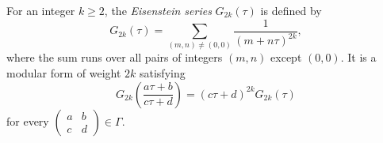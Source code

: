For an integer $k \geq 2$, the \textit{Eisenstein series} $G_{2k}(\tau)$ is defined by
$$G_{2k}(\tau) = \sum_{(m,n) \neq (0,0)} \frac{1}{(m + n\tau)^{2k}},$$
where the sum runs over all pairs of integers $(m,n)$ except $(0,0)$. It is a modular form of weight $2k$ satisfying
$$G_{2k}\left(\frac{a\tau + b}{c\tau + d}\right) = (c\tau + d)^{2k} G_{2k}(\tau)$$
for every $\begin{pmatrix} a & b \\ c & d \end{pmatrix} \in \Gamma$.
